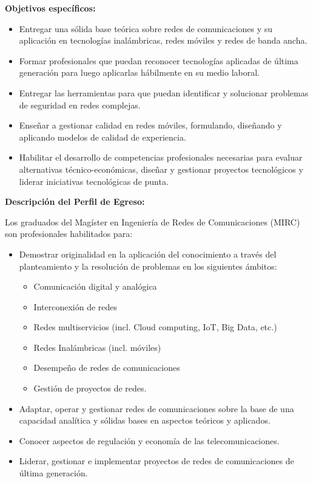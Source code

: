 \noindent\textbf{Objetivos específicos:}

\begin{itemize}
\item Entregar una sólida base teórica sobre redes de comunicaciones y su aplicación en tecnologías 
inalámbricas, redes móviles y redes de banda ancha.
\item Formar profesionales que puedan reconocer tecnologías aplicadas de última generación para 
luego aplicarlas hábilmente en su medio laboral.
\item Entregar las herramientas para que puedan identificar y solucionar problemas de seguridad 
en redes complejas. 
\item Enseñar a gestionar calidad en redes móviles, formulando, diseñando y aplicando modelos de 
calidad de experiencia.
\item Habilitar el desarrollo de competencias profesionales necesarias para evaluar alternativas 
técnico-económicas, diseñar y gestionar proyectos tecnológicos y liderar iniciativas tecnológicas de punta.
\end{itemize}

\noindent\textbf{Descripción del Perfil de Egreso:}

Los graduados del Magíster en Ingeniería de Redes de Comunicaciones (MIRC) son profesionales habilitados para:

\begin{itemize}
\item Demostrar originalidad en la aplicación del conocimiento a través del planteamiento y la resolución de problemas en los siguientes ámbitos:
\begin{itemize}
\item Comunicación digital y analógica
\item Interconexión de redes
\item Redes multiservicios (incl. Cloud computing, IoT, Big Data, etc.)
\item Redes Inalámbricas (incl. móviles)
\item Desempeño de redes de comunicaciones
\item Gestión de proyectos de redes.
\end{itemize}
\item Adaptar, operar y gestionar redes de comunicaciones sobre la base de una capacidad analítica y sólidas bases en aspectos teóricos y aplicados. 
\item Conocer aspectos de regulación y economía de las telecomunicaciones.
\item Liderar, gestionar e implementar proyectos de redes de comunicaciones de última generación.
\end{itemize}

